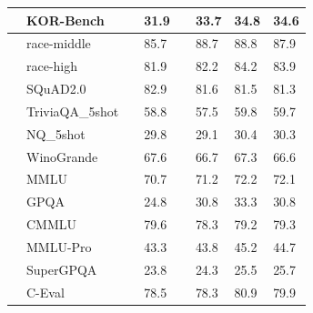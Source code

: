\begin{table}[h]
\begin{tabular}{clllllll}
                                               & KOR-Bench               &  & 31.9                                     &  & 33.7   & 34.8  & 34.6   \\
\midrule
{}        & race-middle            &  & 85.7                                     &  & 88.7   & 88.8  & 87.9   \\
                                               & race-high              &  & 81.9                                     &  & 82.2   & 84.2  & 83.9   \\
                                               & SQuAD2.0               &  & 82.9                                     &  & 81.6   & 81.5  & 81.3   \\
                                               & TriviaQA\_5shot        &  & 58.8                                     &  & 57.5   & 59.8  & 59.7   \\
                                               & NQ\_5shot              &  & 29.8                                     &  & 29.1   & 30.4  & 30.3   \\
                                               & WinoGrande             &  & 67.6                                     &  & 66.7   & 67.3  & 66.6   \\
\midrule
{}        & MMLU                   &  & 70.7                                     &  & 71.2   & 72.2  & 72.1   \\
                                               & GPQA                   &  & 24.8                                     &  & 30.8   & 33.3  & 30.8   \\
                                               & CMMLU                  &  & 79.6                                     &  & 78.3   & 79.2  & 79.3   \\
                                               & MMLU-Pro              &  & 43.3                                     &  & 43.8   & 45.2  & 44.7   \\
                                               & SuperGPQA              &  & 23.8                                     &  & 24.3   & 25.5  & 25.7   \\
                                               & C-Eval                  &  & 78.5                                     &  & 78.3   & 80.9  & 79.9   \\

\end{tabular}
\end{table}
